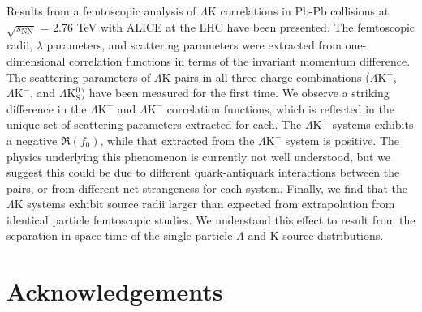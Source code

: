 \documentclass[ALICE,manyauthors]{cernphprep}
\newcommand{\Lam}{$\Lambda$\xspace}
\newcommand{\LamK}{$\Lambda$K\xspace}
\newcommand{\LamKchP}{$\Lambda\mathrm{K^{+}}$\xspace}
\newcommand{\LamKchM}{$\Lambda\mathrm{K^{-}}$\xspace}
\newcommand{\LamKs}{$\Lambda\mathrm{K^{0}_{S}}$\xspace}
\begin{document}
Results from a femtoscopic analysis of \LamK correlations in Pb-Pb collisions at $\sqrt{s_{\mathrm{NN}}}$ = 2.76 TeV with ALICE at the LHC have been presented.
The femtoscopic radii, $\lambda$ parameters, and scattering parameters were extracted from one-dimensional correlation functions in terms of the invariant momentum difference.
The scattering parameters of \LamK pairs in all three charge combinations (\LamKchP, \LamKchM, and \LamKs) have been measured for the first time.
We observe a striking difference in the \LamKchP and \LamKchM correlation functions, which is reflected in the unique set of scattering parameters extracted for each.
The \LamKchP systems exhibits a negative $\Re(f_{0})$, while that extracted from the \LamKchM system is positive.
The physics underlying this phenomenon is currently not well understood, but we suggest this could be due to different quark-antiquark interactions between the pairs, or from different net strangeness for each system. 
Finally, we find that the \LamK systems exhibit source radii larger than expected from extrapolation from identical particle femtoscopic studies.
We understand this effect to result from the separation in space-time of the single-particle \Lam and K source distributions.



\newenvironment{acknowledgement}{\relax}{\relax}
\begin{acknowledgement}
\section*{Acknowledgements}
\end{acknowledgement}



\newpage
\appendix
%
\renewcommand{\thesubfigure}{\thefigure(\alph{subfigure})}
\makeatletter
\renewcommand{\p@subfigure}{}
\renewcommand{\@thesubfigure}{(\alph{subfigure})\hskip\subfiglabelskip}
%
\end{document}
